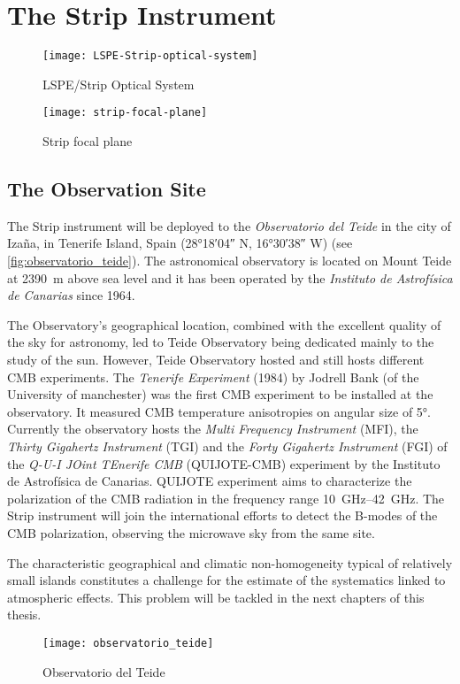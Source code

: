 \section{The Strip Instrument}

\begin{figure}
        \centering
        \texttt{[image: LSPE-Strip-optical-system]}
        \caption{LSPE/Strip Optical System}
        \label{fig:lspe-strip_optical_system}
\end{figure}

\begin{figure}
        \centering
        \texttt{[image: strip-focal-plane]}
        \caption{Strip focal plane}
        \label{fig:strip_focal_plane}
\end{figure}

\subsection{The Observation Site}

The Strip instrument will be deployed to the \emph{Observatorio del Teide}
in the city of Iza\~na, in Tenerife Island, Spain (\ang{28;18;04} N,
\ang{16;30;38} W) (see \autoref{fig:observatorio_teide}). The astronomical
observatory is located on Mount Teide at \SI{2390}{\meter} above sea level
and it has been operated by the \emph{Instituto de Astrof\'isica de
Canarias} since 1964.

The Observatory's geographical location, combined with the excellent
quality of the sky for astronomy, led to Teide Observatory being dedicated
mainly to  the study of the sun. However, Teide Observatory hosted and
still hosts different CMB experiments.
The \emph{Tenerife Experiment} (1984) by Jodrell Bank (of the University of
manchester) was the first CMB experiment to be installed at the
observatory. It measured CMB temperature anisotropies on angular size of
\ang{5}. Currently the observatory hosts the \emph{Multi Frequency
Instrument} (MFI), the \emph{Thirty Gigahertz Instrument} (TGI) and the
\emph{Forty Gigahertz Instrument} (FGI) of the \emph{Q-U-I JOint TEnerife
CMB} (QUIJOTE-CMB) experiment by the Instituto de Astrof\'isica de
Canarias. QUIJOTE experiment aims to characterize the
polarization of the CMB radiation in the frequency range
\SIrange{10}{42}{\giga\hertz}. The Strip instrument will join the
international efforts to detect the B-modes of the CMB polarization,
observing the microwave sky from the same site.

The characteristic geographical and climatic non-homogeneity typical of
relatively small islands constitutes a challenge for the estimate of the
systematics linked to atmospheric effects. This problem will be tackled in
the next chapters of this thesis.



\begin{figure}
        \centering
        \texttt{[image: observatorio\_teide]}
        \caption{Observatorio del Teide}
        \label{fig:observatorio_teide}
\end{figure}

